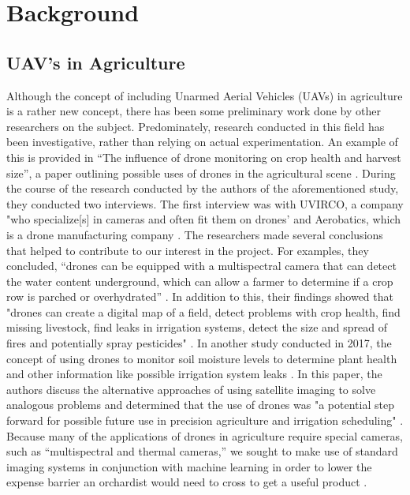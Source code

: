 \section{Background}
\subsection{UAV's in Agriculture}
Although the concept of including Unarmed Aerial Vehicles (UAVs) in agriculture is a rather new concept, there has been some preliminary work done by other researchers on the subject.
Predominately, research conducted in this field has been investigative, rather than relying on actual experimentation.
An example of this is provided in ``The influence of drone monitoring on crop health and harvest size'', a paper outlining possible uses of drones in the agricultural scene \cite{Reinecke2017}.
During the course of the research conducted by the authors of the aforementioned study, they conducted two interviews. 
The first interview was with UVIRCO, a company "who specialize[s] in cameras and often fit them on drones' and Aerobatics, which is a drone manufacturing company \cite{Reinecke2017}.
The researchers made several conclusions that helped to contribute to our interest in the project.
For examples, they concluded, ``drones can be equipped with a multispectral camera that can detect the water content underground, which can allow a farmer to determine if a crop row is parched or overhydrated'' \cite{Reinecke2017}.
In addition to this, their findings showed that "drones can create a digital map of a field, detect problems with crop health, find missing livestock, find leaks in irrigation systems, detect the size and spread of fires and potentially spray pesticides" \cite{Reinecke2017}.
In another study conducted in 2017, the concept of using drones to monitor soil moisture levels to determine plant health and other information like possible irrigation system leaks \cite{Hassan2017}. In this paper, the authors discuss the alternative approaches of using satellite imaging to solve analogous problems and determined that the use of drones was "a potential step forward for possible future use in precision agriculture and irrigation scheduling" \cite{Hassan2017}.
\\
Because many of the applications of drones in agriculture require special cameras, such as ``multispectral and thermal cameras,'' we sought to make use of standard imaging systems in conjunction with machine learning in order to lower the expense barrier an orchardist would need to cross to get a useful product \cite{Reinecke2017}.